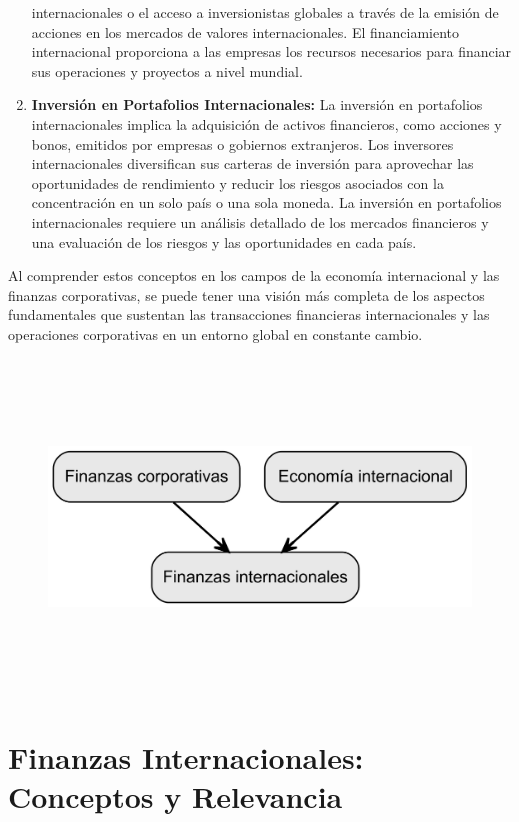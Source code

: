 \documentclass[
  a4paper,
]{article}
\begin{document}
\begin{enumerate}
  internacionales o el acceso a inversionistas globales a través de la
  emisión de acciones en los mercados de valores internacionales. El
  financiamiento internacional proporciona a las empresas los recursos
  necesarios para financiar sus operaciones y proyectos a nivel mundial.
\item
  \textbf{Inversión en Portafolios Internacionales:} La inversión en
  portafolios internacionales implica la adquisición de activos
  financieros, como acciones y bonos, emitidos por empresas o gobiernos
  extranjeros. Los inversores internacionales diversifican sus carteras
  de inversión para aprovechar las oportunidades de rendimiento y
  reducir los riesgos asociados con la concentración en un solo país o
  una sola moneda. La inversión en portafolios internacionales requiere
  un análisis detallado de los mercados financieros y una evaluación de
  los riesgos y las oportunidades en cada país.
\end{enumerate}

Al comprender estos conceptos en los campos de la economía internacional
y las finanzas corporativas, se puede tener una visión más completa de
los aspectos fundamentales que sustentan las transacciones financieras
internacionales y las operaciones corporativas en un entorno global en
constante cambio.

\begin{figure}[H]

{\centering \includegraphics[width=5.5in,height=3.5in]{index_files/figure-latex/dot-figure-1.png}

}

\end{figure}

\hypertarget{finanzas-internacionales-conceptos-y-relevancia}{%
\section{Finanzas Internacionales: Conceptos y
Relevancia}\label{finanzas-internacionales-conceptos-y-relevancia}}
\end{document}
